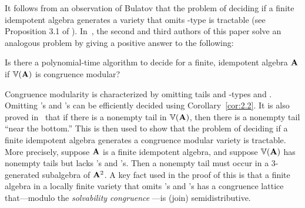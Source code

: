 

It follows from an observation of Bulatov that the problem of deciding if a finite idempotent algebra generates a variety that omits \tct-type \utyp is tractable (see Proposition 3.1 of \cite{MR2504025}).
In~\cite{Freese:2009}, the second and third authors of this paper solve an
analogous problem by giving a positive answer to the following:
\begin{prob}
  \label{prob:2}
  Is there a polynomial-time algorithm to decide for a finite,
  idempotent algebra $\mathbf{A}$ if $\operatorname{\mathbb{V}}(\mathbf{A})$ is congruence modular?
\end{prob}

Congruence modularity is characterized by omitting tails and
\tct-types \utyp and \styp.
Omitting \utyp's and \styp's can be efficiently decided using Corollary~\ref{cor:2.2}. %
It is also proved in~\cite{Freese:2009} that
if there is a
nonempty
tail in $\operatorname{\mathbb{V}}(\mathbf{A})$, then there is a
nonempty
tail ``near the bottom.'' This is then used to show that the problem of deciding if a finite idempotent algebra generates a congruence modular variety is tractable.
More precisely, suppose $\mathbf{A}$ is a finite idempotent algebra, and suppose
$\operatorname{\mathbb{V}}(\mathbf{A})$ has nonempty tails but lacks \utyp's and \styp's.
Then a nonempty tail must occur in a 3-generated subalgebra of $\mathbf{A}^2$.
A key fact used in the proof of this is that a finite algebra in a locally finite variety that omits
\utyp's and \styp's has a congruence lattice that---modulo
the {\it solvability congruence} ---is (join) semidistributive.


%

